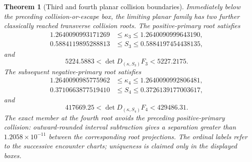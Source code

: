 \documentclass[11pt]{article}
\newtheorem{theorem}{Theorem}
\begin{document}
\begin{theorem}[Third and fourth planar collision boundaries]
Immediately below the preceding collision-or-escape box, the limiting planar
family has two further classically reached transverse collision roots.  The
positive-primary root satisfies
\[
 \begin{aligned}
  1.2640090993171269&\le\kappa_3\le1.2640090999643190,\\
  0.5884119895288813&\le S_3\le0.5884197454438135,
 \end{aligned}
\]
and
\[
 5224.5883<\det D_{(\kappa,S_3)}F_3<5227.2175.
\]
The subsequent negative-primary root satisfies
\[
 \begin{aligned}
  1.2640090985775962&\le\kappa_4\le1.2640090992806481,\\
  0.3710663877519410&\le S_4\le0.3726139177003617,
 \end{aligned}
\]
and
\[
 417669.25<\det D_{(\kappa,S_4)}F_4<429486.31.
\]
The exact member at the fourth root avoids the preceding positive-primary
collision: outward-rounded interval subtraction gives a separation greater
than $1.2058\times10^{-11}$ between the corresponding root projections.
The ordinal labels refer to the successive encounter charts; uniqueness is
claimed only in the displayed boxes.
\end{theorem}
\end{document}
